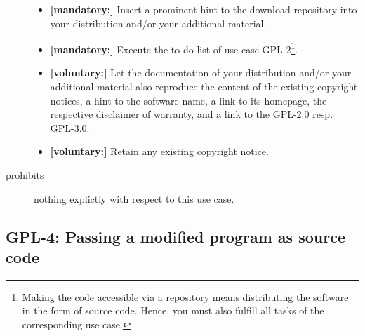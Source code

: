 \begin{description}
\begin{itemize}
  \item \textbf{[mandatory:]} Insert a prominent hint to the download repository
  into your distribution and/or your additional material.
  
  \item \textbf{[mandatory:]} Execute the to-do list of use case GPL-2\footnote{
  Making the code accessible via a repository means distributing the software in
  the form of source code. Hence, you must also fulfill all tasks of the
  corresponding use case.}.
   
  \item \textbf{[voluntary:]} Let the documentation of your distribution and/or
  your additional material also reproduce the content of the existing
  copyright notices, a hint to the software name, a link to its homepage,
  the respective disclaimer of warranty, and a link to the GPL-2.0 resp.
  GPL-3.0.
  
  \item \textbf{[voluntary:]} Retain any existing copyright notice. 

\end{itemize}

\item[prohibits] nothing explictly with respect to this use case.

\end{description}

\subsection{GPL-4: Passing a modified program as source code}
\label{OSUC-04-GPL} 


